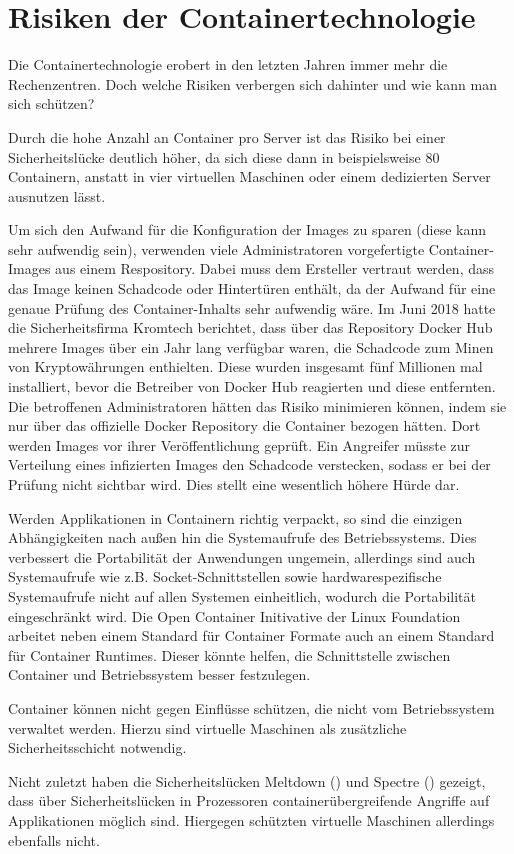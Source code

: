 \section{Risiken der Containertechnologie}
\label{sec:Risiken der Containertechnologie}
Die Containertechnologie erobert in den letzten Jahren immer mehr die Rechenzentren. Doch welche Risiken verbergen sich dahinter und wie kann man sich schützen?

Durch die hohe Anzahl an Container pro Server ist das Risiko bei einer Sicherheitslücke deutlich höher, da sich diese dann in beispielsweise 80 Containern, anstatt in vier virtuellen Maschinen oder einem dedizierten Server ausnutzen lässt.\cite{Risiken}

Um sich den Aufwand für die Konfiguration der Images zu sparen (diese kann sehr aufwendig sein), verwenden viele Administratoren vorgefertigte Container-Images aus einem Respository.
Dabei muss dem Ersteller vertraut werden, dass das Image keinen Schadcode oder Hintertüren enthält, da der Aufwand für eine genaue Prüfung des Container-Inhalts sehr aufwendig wäre.
Im Juni 2018 hatte die Sicherheitsfirma Kromtech berichtet, dass über das Repository Docker Hub mehrere Images über ein Jahr lang verfügbar waren, die Schadcode zum Minen von Kryptowährungen enthielten.
Diese wurden insgesamt fünf Millionen mal installiert, bevor die Betreiber von Docker Hub reagierten und diese entfernten.
\cite{kromtech}
Die betroffenen Administratoren hätten das Risiko minimieren können, indem sie nur über das offizielle Docker Repository die Container bezogen hätten.
Dort werden Images vor ihrer Veröffentlichung geprüft.
\cite{DockerHubOfficial}
Ein Angreifer müsste zur Verteilung eines infizierten Images den Schadcode verstecken, sodass er bei der Prüfung nicht sichtbar wird. Dies stellt eine wesentlich höhere Hürde dar.

Werden Applikationen in Containern richtig verpackt, so sind die einzigen Abhängigkeiten nach außen hin die Systemaufrufe des Betriebssystems.
Dies verbessert die Portabilität der Anwendungen ungemein, allerdings sind auch Systemaufrufe wie z.B. Socket-Schnittstellen sowie hardwarespezifische Systemaufrufe nicht auf allen Systemen einheitlich, wodurch die Portabilität eingeschränkt wird.
Die Open Container Initivative der Linux Foundation arbeitet neben einem Standard für Container Formate auch an einem Standard für Container Runtimes.
Dieser könnte helfen, die Schnittstelle zwischen Container und Betriebssystem besser festzulegen.

Container können nicht gegen Einflüsse schützen, die nicht vom Betriebssystem verwaltet werden. Hierzu sind virtuelle Maschinen als zusätzliche Sicherheitsschicht notwendig.\cite{11517836120160501}

Nicht zuletzt haben die Sicherheitslücken Meltdown (\cite{DBLP:journals/corr/abs-1801-01207}) und Spectre (\cite{DBLP:journals/corr/abs-1801-01203}) gezeigt, dass über Sicherheitslücken in Prozessoren containerübergreifende Angriffe auf Applikationen möglich sind. Hiergegen schützten virtuelle Maschinen allerdings ebenfalls nicht.  
